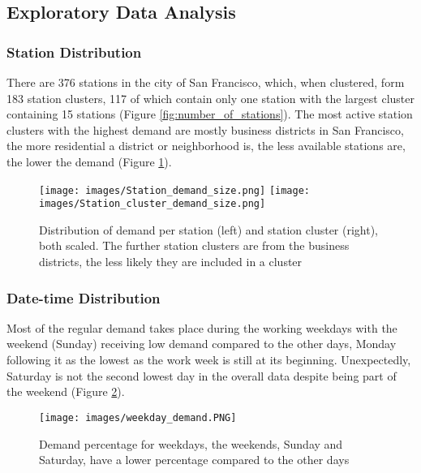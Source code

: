 \documentclass{article}
\begin{document}
\subsection{Exploratory Data Analysis}

\subsubsection{Station Distribution}

There are 376 stations in the city of San Francisco, which, when clustered, form 183 station clusters, 117 of which contain only one station with the largest cluster containing 15 stations (Figure \ref{fig:number_of_stations}). The most active station clusters with the highest demand are mostly business districts in San Francisco, the more residential a district or neighborhood is, the less available stations are, the lower the demand (Figure \ref{fig:cluster_demand_distribution}).

\begin{figure}
    \texttt{[image: images/Station\_demand\_size.png]}
    \texttt{[image: images/Station\_cluster\_demand\_size.png]}
    
    \caption{Distribution of demand per station (left) and station cluster (right), both scaled. The further station clusters are from the business districts, the less likely they are included in a cluster}
\label{fig:cluster_demand_distribution}
\end{figure}

\subsubsection{Date-time Distribution}

Most of the regular demand takes place during the working weekdays with the weekend (Sunday) receiving low demand compared to the other days, Monday following it as the lowest as the work week is still at its beginning. Unexpectedly, Saturday is not the second lowest day in the overall data despite being part of the weekend (Figure \ref{fig:weekday_demand}).

\begin{figure}
\hspace{4cm}
\texttt{[image: images/weekday\_demand.PNG]}
\caption{Demand percentage for weekdays, the weekends, Sunday and Saturday, have a lower percentage compared to the other days}
\label{fig:weekday_demand}
\end{figure}
\end{document}
